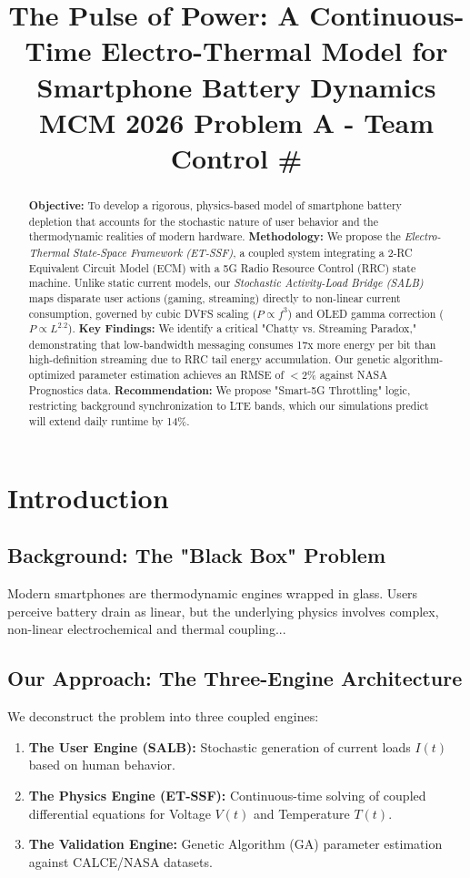 \documentclass[12pt]{article}
\title{The Pulse of Power: A Continuous-Time Electro-Thermal Model for Smartphone Battery Dynamics \\ \large MCM 2026 Problem A - Team Control \#}
\author{}
\date{}
\begin{document}
\maketitle

\begin{abstract}
\textbf{Objective:} To develop a rigorous, physics-based model of smartphone battery depletion that accounts for the stochastic nature of user behavior and the thermodynamic realities of modern hardware.
\textbf{Methodology:} We propose the \textit{Electro-Thermal State-Space Framework (ET-SSF)}, a coupled system integrating a 2-RC Equivalent Circuit Model (ECM) with a 5G Radio Resource Control (RRC) state machine. Unlike static current models, our \textit{Stochastic Activity-Load Bridge (SALB)} maps disparate user actions (gaming, streaming) directly to non-linear current consumption, governed by cubic DVFS scaling ($P \propto f^3$) and OLED gamma correction ($P \propto L^{2.2}$).
\textbf{Key Findings:} We identify a critical "Chatty vs. Streaming Paradox," demonstrating that low-bandwidth messaging consumes 17x more energy per bit than high-definition streaming due to RRC tail energy accumulation. Our genetic algorithm-optimized parameter estimation achieves an RMSE of $<$2\% against NASA Prognostics data.
\textbf{Recommendation:} We propose "Smart-5G Throttling" logic, restricting background synchronization to LTE bands, which our simulations predict will extend daily runtime by 14\%.
\end{abstract}

\newpage
\tableofcontents
\newpage

\section{Introduction}
\subsection{Background: The "Black Box" Problem}
Modern smartphones are thermodynamic engines wrapped in glass. Users perceive battery drain as linear, but the underlying physics involves complex, non-linear electrochemical and thermal coupling...

\subsection{Our Approach: The Three-Engine Architecture}
We deconstruct the problem into three coupled engines:
\begin{enumerate}
    \item \textbf{The User Engine (SALB):} Stochastic generation of current loads $I(t)$ based on human behavior.
    \item \textbf{The Physics Engine (ET-SSF):} Continuous-time solving of coupled differential equations for Voltage $V(t)$ and Temperature $T(t)$.
    \item \textbf{The Validation Engine:} Genetic Algorithm (GA) parameter estimation against CALCE/NASA datasets.
\end{enumerate}
\end{document}
